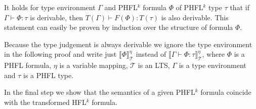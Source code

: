 \begin{remark}
    It holds for type environment $\Gamma$ and PHFL$^k$ formula $\Phi$ of PHFL$^k$ type $\tau$ that if $\Gamma \vdash
    \Phi \colon \tau$ is derivable, then $T(\Gamma) \vdash F(\Phi) \colon T(\tau)$ is also derivable. This statement
    can easily be proven by induction over the structure of formula $\Phi$.
\end{remark}

Because the type judgement is always derivable we ignore the type environment in the following proof and write just $\llbracket \Phi \rrbracket^\eta_\mathcal{T}$ instead of $\llbracket \Gamma \vdash \Phi \colon \tau \rrbracket^\eta_\mathcal{T}$, where $\Phi$ is a PHFL formula, $\eta$ is a variable mapping, $\mathcal{T}$ is an LTS, $\Gamma$ is a type environment and $\tau$ is a PHFL type. 

In the final step we show that the semantics of a given PHFL$^k$ formula coincide with the transformed HFL$^k$ formula.

